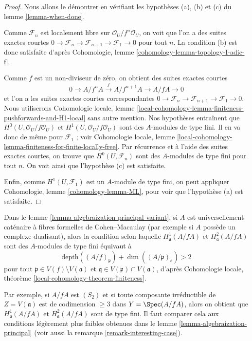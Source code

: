 \begin{proof}
Nous allons le démontrer en vérifiant les hypothèses (a), (b) et (c) du
lemme \ref{lemma-when-done}.

\medskip\noindent
Comme $\mathcal{F}_n$ est localement libre sur $\mathcal{O}_U/f^n\mathcal{O}_U$,
on voit que l'on a des suites exactes courtes
$0 \to \mathcal{F}_n \to \mathcal{F}_{n + 1} \to \mathcal{F}_1 \to 0$
pour tout $n$. La condition (b) est donc satisfaite d'après
Cohomologie, lemme \ref{cohomology-lemma-topology-I-adic-f}.

\medskip\noindent
Comme $f$ est un non-diviseur de zéro, on obtient des suites exactes courtes
$$
0 \to A/f^nA \xrightarrow{f} A/f^{n + 1}A \to A/fA \to 0
$$
et l'on a les suites exactes courtes correspondantes
$0 \to \mathcal{F}_n \to \mathcal{F}_{n + 1} \to \mathcal{F}_1 \to 0$.
Nous utiliserons
Cohomologie locale, lemme
\ref{local-cohomology-lemma-finiteness-pushforwards-and-H1-local}
sans autre mention. Nos hypothèses entraînent que
$H^0(U, \mathcal{O}_U/f\mathcal{O}_U)$ et
$H^1(U, \mathcal{O}_U/f\mathcal{O}_U)$
sont des $A$-modules de type fini. Il en va donc de même pour $\mathcal{F}_1$ ; voir
Cohomologie locale, lemme
\ref{local-cohomology-lemma-finiteness-for-finite-locally-free}.
Par récurrence et à l'aide des suites exactes courtes, on trouve que
$H^0(U, \mathcal{F}_n)$ sont des $A$-modules de type fini pour tout $n$.
On voit ainsi que l'hypothèse (c) est satisfaite.

\medskip\noindent
Enfin, comme $H^1(U, \mathcal{F}_1)$ est un $A$-module de type fini,
on peut appliquer Cohomologie, lemme \ref{cohomology-lemma-ML},
pour voir que l'hypothèse (a) est satisfaite.
\end{proof}

\begin{remark}
\label{remark-interesting-case-variant}
Dans le lemme \ref{lemma-algebraization-principal-variant},
si $A$ est universellement caténaire à fibres formelles
de Cohen--Macaulay (par exemple si $A$ possède un complexe dualisant), alors
la condition selon laquelle
$H^1_\mathfrak a(A/fA)$ et $H^2_\mathfrak a(A/fA)$
sont des $A$-modules de type fini équivaut à
$$
\text{depth}((A/f)_\mathfrak p) + \dim((A/\mathfrak p)_\mathfrak q) > 2
$$
pour tout $\mathfrak p \in V(f) \setminus V(\mathfrak a)$
et $\mathfrak q \in V(\mathfrak p) \cap V(\mathfrak a)$,
d'après Cohomologie locale, théorème \ref{local-cohomology-theorem-finiteness}.

\medskip\noindent
Par exemple, si $A/fA$ est $(S_2)$ et si toute composante irréductible
de $Z = V(\mathfrak a)$ est de codimension $\geq 3$
dans $Y = \Spec(A/fA)$, alors on obtient que
$H^1_\mathfrak a(A/fA)$ et $H^2_\mathfrak a(A/fA)$ sont de type fini.
Il faut comparer cela aux conditions légèrement plus faibles
obtenues dans le lemme \ref{lemma-algebraization-principal}
(voir aussi la remarque \ref{remark-interesting-case}).
\end{remark}







